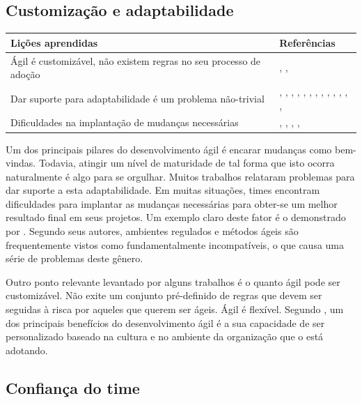 \subsection{Customização e adaptabilidade}

\begin{table}[H]
	\centering
	\begin{tabularx}{\linewidth}{ | X | p{5cm} | } \hline \textbf{Lições aprendidas} & \textbf{Referências} \\ \hline
		Ágil é customizável, não existem regras no seu processo de adoção & \cite{Hajjdiab2011}, \cite{Piegas2012}, \cite{Hui2013} \\ \hline
		Dar suporte para adaptabilidade é um problema não-trivial & \cite{Block2011}, \cite{Asnawi2012}, \cite{Fitzgerald2013}, \cite{Bustard2013}, \cite{Microsoft2013}, \cite{Lapham2012}, \cite{Claudia2013}, \cite{Nokia2013}, \cite{Rodrigues2013}, \cite{Bastos2013}, \cite{Maciel2013}, \cite{Hui2013}, \cite{Ahmed2008}, \cite{Sahota2012} \\ \hline
		Dificuldades na implantação de mudanças necessárias & \cite{Vieira2013}, \cite{Bastos2013}, \cite{Maciel2013}, \cite{Hui2013}, \cite{Sahota2012} \\ \hline
	\end{tabularx}
\end{table}

Um dos principais pilares do desenvolvimento ágil é encarar mudanças como bem-vindas. Todavia, atingir um nível de maturidade de tal forma que isto ocorra naturalmente é algo para se orgulhar. Muitos trabalhos relataram problemas para dar suporte a esta adaptabilidade. Em muitas situações, times encontram dificuldades para implantar as mudanças necessárias para obter-se um melhor resultado final em seus projetos. Um exemplo claro deste fator é o demonstrado por \cite{Fitzgerald2013}. Segundo seus autores, ambientes regulados e métodos ágeis são frequentemente vistos como fundamentalmente incompatíveis, o que causa uma série de problemas deste gênero.

Outro ponto relevante levantado por alguns trabalhos é o quanto ágil pode ser customizável. Não exite um conjunto pré-definido de regras que devem ser seguidas à risca por aqueles que querem ser ágeis. Ágil é flexível. Segundo \cite{Hajjdiab2011}, um dos principais benefícios do desenvolvimento ágil é a sua capacidade de ser personalizado baseado na cultura e no ambiente da organização que o está adotando.

\subsection{Confiança do time}

